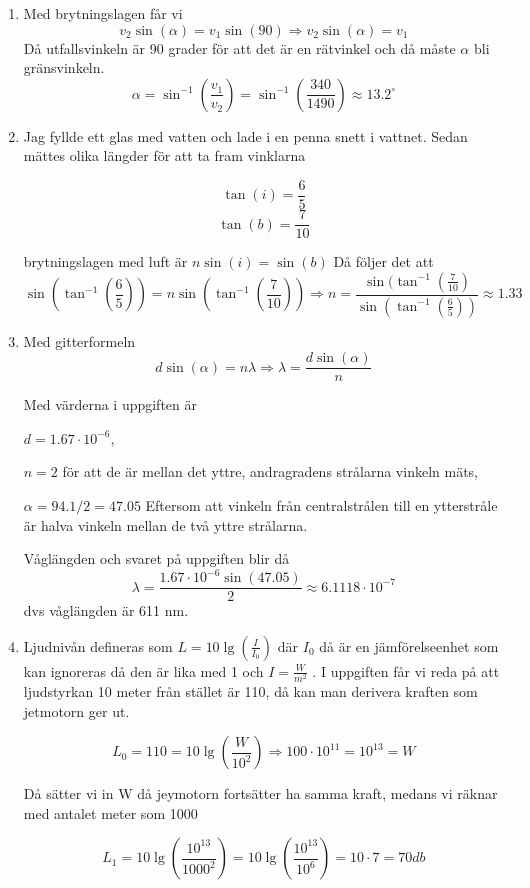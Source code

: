 \documentclass[a4paper,12pt]{article}
\begin{document}
\begin{enumerate}
    \item Med brytningslagen får vi
          $$v_2\sin(\alpha)=v_1\sin(90)\Rightarrow v_2\sin(\alpha)=v_1$$
          Då utfallsvinkeln är 90 grader för att det är en rätvinkel
          och då måste $\alpha$ bli gränsvinkeln.
          $$\alpha = \sin^{-1}(\frac{v_1}{v_2})=\sin^{-1}(\frac{340}{1490})\approx 13.2^\circ$$

    \item Jag fyllde ett glas med vatten och lade i en penna snett i vattnet.
          Sedan mättes olika längder för att ta fram vinklarna

          $$\tan(i)=\frac{6}{5}$$
          $$\tan(b)=\frac{7}{10}$$

          brytningslagen med luft är $n\sin(i)=\sin(b)$
          Då följer det att
          $$\sin(\tan^{-1}(\frac{6}{5}))=n\sin(\tan^{-1}(\frac{7}{10}))\Rightarrow n=\frac{\sin(\tan^{-1}(\frac{7}{10})}{\sin(\tan^{-1}(\frac{6}{5}))}\approx 1.33$$

    \item Med gitterformeln
          $$d\sin(\alpha)=n\lambda\Rightarrow \lambda=\frac{d\sin(\alpha)}{n}$$

          Med värderna i uppgiften är

          $d=1.67\cdot 10^{-6}$,

          $n=2$ för att de är mellan det yttre, andragradens strålarna vinkeln mäts,

          $\alpha = 94.1/2 = 47.05$ Eftersom att vinkeln från centralstrålen till en ytterstråle är halva vinkeln
          mellan de två yttre strålarna.

          Våglängden och svaret på uppgiften blir då
          $$\lambda=\frac{1.67\cdot 10^{-6}{\sin(47.05)}}{2}\approx 6.1118\cdot 10^{-7}$$
          dvs våglängden är 611 nm.

    \item Ljudnivån defineras som $L=10\lg(\frac{I}{I_0})$ där $I_0$ då är en jämförelseenhet
          som kan ignoreras då den är lika med 1 och $I=\frac{W}{m^2}$ . I uppgiften får vi reda på att
          ljudstyrkan 10 meter från stället är 110, då kan man derivera kraften som
          jetmotorn ger ut.

          $$L_0=110=10\lg(\frac{W}{10^2})\Rightarrow 100\cdot 10^{11}=10^{13}=W$$

          Då sätter vi in W då jeymotorn fortsätter ha samma kraft, medans vi räknar med antalet meter som 1000

          $$L_1=10\lg(\frac{10^{13}}{1000^2})=10\lg(\frac{10^{13}}{10^6})=10\cdot 7 = 70db$$


\end{enumerate}
\end{document}
